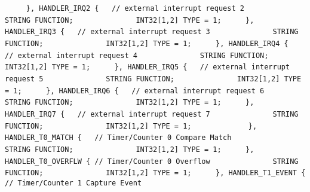 {{{{\lstinline!	    }, HANDLER_IRQ2 {	// external interrupt request 2! \newline
\lstinline!              STRING FUNCTION;! \newline
\lstinline!              INT32[1,2] TYPE = 1;! \newline
\lstinline!	    }, HANDLER_IRQ3 {	// external interrupt request 3! \newline
\lstinline!              STRING FUNCTION;! \newline
\lstinline!              INT32[1,2] TYPE = 1;! \newline
\lstinline!	    }, HANDLER_IRQ4 {	// external interrupt request 4! \newline
\lstinline!              STRING FUNCTION;! \newline
\lstinline!              INT32[1,2] TYPE = 1;! \newline
\lstinline!	    }, HANDLER_IRQ5 {	// external interrupt request 5! \newline
\lstinline!              STRING FUNCTION;! \newline
\lstinline!              INT32[1,2] TYPE = 1;! \newline
\lstinline!	    }, HANDLER_IRQ6 {	// external interrupt request 6! \newline
\lstinline!              STRING FUNCTION;! \newline
\lstinline!              INT32[1,2] TYPE = 1;! \newline
\lstinline!	    }, HANDLER_IRQ7 {	// external interrupt request 7! \newline
\lstinline!              STRING FUNCTION;! \newline
\lstinline!              INT32[1,2] TYPE = 1;! \newline
\lstinline!	      ! \newline
\lstinline!	    }, HANDLER_T0_MATCH {	// Timer/Counter 0 Compare Match! \newline
\lstinline!              STRING FUNCTION;! \newline
\lstinline!              INT32[1,2] TYPE = 1;! \newline
\lstinline!	    }, HANDLER_T0_OVERFLW {	// Timer/Counter 0 Overflow! \newline
\lstinline!              STRING FUNCTION;! \newline
\lstinline!              INT32[1,2] TYPE = 1;! \newline
\lstinline!	    }, HANDLER_T1_EVENT {	// Timer/Counter 1 Capture Event! \newline
}}}}
